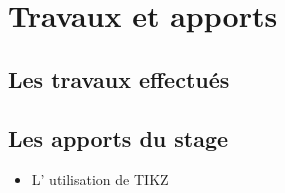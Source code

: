 
\chapter{Travaux et apports} %

\label{Chapter4} %



\section{Les travaux effectués}


\section{Les apports du stage}

\begin{itemize}
    \item L' utilisation de TIKZ
\end{itemize}